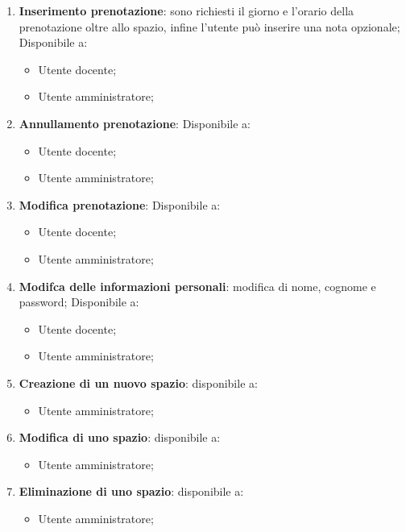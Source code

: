 \begin{enumerate}
	\item \textbf{Inserimento prenotazione}:
	      sono richiesti il giorno e l'orario della prenotazione oltre allo
	      spazio, infine l'utente può inserire una nota opzionale; Disponibile
	      a:
	      \begin{itemize}
		      \item Utente docente;
		      \item Utente amministratore;
	      \end{itemize}

	\item \textbf{Annullamento prenotazione}:
	      Disponibile a:
	      \begin{itemize}
		      \item Utente docente;
		      \item Utente amministratore;
	      \end{itemize}

	\item \textbf{Modifica prenotazione}: Disponibile a:
	      \begin{itemize}
		      \item Utente docente;
		      \item Utente amministratore;
	      \end{itemize}

	\item \textbf{Modifca delle informazioni personali}: modifica di nome,
	      cognome e password;
	      Disponibile a:
	      \begin{itemize}
		      \item Utente docente;
		      \item Utente amministratore;
	      \end{itemize}

	\item \textbf{Creazione di un nuovo spazio}: disponibile a:
	      \begin{itemize}
		      \item Utente amministratore;
	      \end{itemize}

	\item \textbf{Modifica di uno spazio}: disponibile a:
	      \begin{itemize}
		      \item Utente amministratore;
	      \end{itemize}

	\item \textbf{Eliminazione di uno spazio}: disponibile a:
	      \begin{itemize}
		      \item Utente amministratore;
	      \end{itemize}


\end{enumerate}

